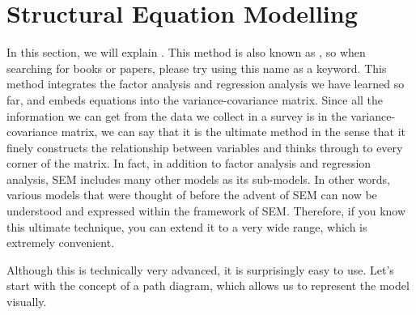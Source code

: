 \documentclass{ltjsbook}
\begin{document}
\chapter{Structural Equation Modelling}
\label{x12_SEM}

In this section, we will explain . This method is also known as , so when searching for books or papers, please try using this name as a keyword. This method integrates the factor analysis and regression analysis we have learned so far, and embeds equations into the variance-covariance matrix. Since all the information we can get from the data we collect in a survey is in the variance-covariance matrix, we can say that it is the ultimate method in the sense that it finely constructs the relationship between variables and thinks through to every corner of the matrix. In fact, in addition to factor analysis and regression analysis, SEM includes many other models as its sub-models. In other words, various models that were thought of before the advent of SEM can now be understood and expressed within the framework of SEM. Therefore, if you know this ultimate technique, you can extend it to a very wide range, which is extremely convenient.

Although this is technically very advanced, it is surprisingly easy to use. Let's start with the concept of a path diagram, which allows us to represent the model visually.
\end{document}
